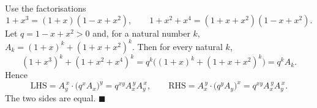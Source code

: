Use the factorisations
\[
1+x^3=(1+x)(1-x+x^2),\qquad 1+x^2+x^4=(1+x+x^2)(1-x+x^2).
\]
Let $q=1-x+x^2>0$ and, for a natural number $k$, $A_k=(1+x)^k+(1+x+x^2)^k$. Then for every natural $k$,
\[
(1+x^3)^k+(1+x^2+x^4)^k=q^k\bigl((1+x)^k+(1+x+x^2)^k\bigr)=q^kA_k .
\]
Hence
\[
\text{LHS}=A_y^{\,x}\cdot\bigl(q^xA_x\bigr)^y=q^{xy}A_x^{\,y}A_y^{\,x},\qquad
\text{RHS}=A_x^{\,y}\cdot\bigl(q^yA_y\bigr)^x=q^{xy}A_x^{\,y}A_y^{\,x}.
\]
The two sides are equal. $\blacksquare$
